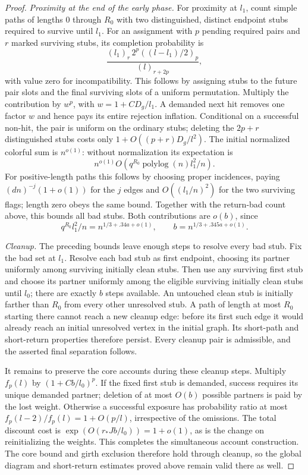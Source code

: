 \begin{proof}
\emph{Proximity at the end of the early phase.}
For proximity at $l_1$, count simple paths of lengths $0$ through
$R_0$ with two distinguished, distinct endpoint stubs required to
survive until $l_1$. For an assignment with $p$ pending required pairs
and $r$ marked surviving stubs, its completion probability is
\[
 \frac{(l_1)_r\,2^p((l-l_1)/2)_p}{(l)_{r+2p}},
\]
with value zero for incompatibility. This follows by assigning stubs
to the future pair slots and the final surviving slots of a uniform
permutation. Multiply the contribution by $w^p$, with
$w=1+CD_g/l_1$. A demanded next hit removes one factor $w$ and hence
pays its entire rejection inflation. Conditional on a successful
non-hit, the pair is uniform on the ordinary stubs; deleting the
$2p+r$ distinguished stubs costs only
$1+O((p+r)D_g/l^2)$. The initial normalized colorful sum is
$n^{o(1)}$: without normalization its expectation is
\[
 n^{o(1)}O\left(q^{R_0}\operatorname{polylog}(n)l_1^2/n\right).
\]
For positive-length paths this follows by choosing proper incidences,
paying $(dn)^{-j}(1+o(1))$ for the $j$ edges and
$O((l_1/n)^2)$ for the two surviving flags; length zero obeys the same
bound. Together with the return-bad count above, this bounds all bad stubs.
Both contributions are $o(b)$, since
\[
 q^{R_0}l_1^2/n=n^{1/3+.34a+o(1)},\qquad
 b=n^{1/3+.345a+o(1)}.
\]

\emph{Cleanup.}
The preceding bounds leave enough steps to resolve every bad stub.
Fix the bad set at $l_1$. Resolve each bad stub as first endpoint,
choosing its partner uniformly among surviving initially clean stubs.
Then use any surviving first stub and choose its partner uniformly
among the eligible surviving initially clean stubs until $l_0$; there
are exactly $b$ steps available. An untouched clean
stub is initially farther than $R_0$ from every other unresolved stub.
A path of length at most $R_0$ starting there cannot reach a new
cleanup edge: before its first such edge it would already reach an
initial unresolved vertex in the initial graph. Its short-path and
short-return properties therefore persist. Every cleanup pair is
admissible, and the asserted final separation follows.

It remains to preserve the core accounts during these cleanup steps.
Multiply $f_p(l)$ by
$(1+Cb/l_0)^p$. If the fixed first stub is demanded, success requires
its unique demanded partner; deletion of at most $O(b)$ possible
partners is paid by the lost weight. Otherwise a successful exposure
has probability ratio at most
$f_p(l-2)/f_p(l)=1+O(p/l)$, irrespective of the omissions. The total
discount cost is $\exp(O(r_*Jb/l_0))=1+o(1)$, as is the change on
reinitializing the weights. This completes the simultaneous account
construction. The core bound and girth exclusion therefore hold
through cleanup, so the global diagram and short-return estimates proved
above remain valid there as well.
\end{proof}

